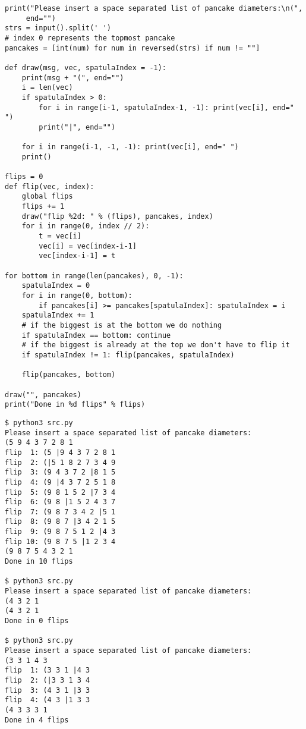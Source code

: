 \documentclass[11pt]{article}
\begin{document}
\begin{verbatim}
print("Please insert a space separated list of pancake diameters:\n(",
     end="")
strs = input().split(' ')
# index 0 represents the topmost pancake
pancakes = [int(num) for num in reversed(strs) if num != ""]

def draw(msg, vec, spatulaIndex = -1):
    print(msg + "(", end="")
    i = len(vec)
    if spatulaIndex > 0: 
        for i in range(i-1, spatulaIndex-1, -1): print(vec[i], end=" ")
        print("|", end="")

    for i in range(i-1, -1, -1): print(vec[i], end=" ")
    print()

flips = 0
def flip(vec, index):
    global flips
    flips += 1
    draw("flip %2d: " % (flips), pancakes, index)
    for i in range(0, index // 2):
        t = vec[i]
        vec[i] = vec[index-i-1]
        vec[index-i-1] = t

for bottom in range(len(pancakes), 0, -1):
    spatulaIndex = 0
    for i in range(0, bottom):
        if pancakes[i] >= pancakes[spatulaIndex]: spatulaIndex = i
    spatulaIndex += 1
    # if the biggest is at the bottom we do nothing
    if spatulaIndex == bottom: continue
    # if the biggest is already at the top we don't have to flip it
    if spatulaIndex != 1: flip(pancakes, spatulaIndex)

    flip(pancakes, bottom)

draw("", pancakes)
print("Done in %d flips" % flips)
\end{verbatim}

\begin{verbatim}
$ python3 src.py
Please insert a space separated list of pancake diameters:
(5 9 4 3 7 2 8 1
flip  1: (5 |9 4 3 7 2 8 1 
flip  2: (|5 1 8 2 7 3 4 9 
flip  3: (9 4 3 7 2 |8 1 5 
flip  4: (9 |4 3 7 2 5 1 8 
flip  5: (9 8 1 5 2 |7 3 4 
flip  6: (9 8 |1 5 2 4 3 7 
flip  7: (9 8 7 3 4 2 |5 1 
flip  8: (9 8 7 |3 4 2 1 5 
flip  9: (9 8 7 5 1 2 |4 3 
flip 10: (9 8 7 5 |1 2 3 4 
(9 8 7 5 4 3 2 1 
Done in 10 flips

$ python3 src.py
Please insert a space separated list of pancake diameters:
(4 3 2 1
(4 3 2 1 
Done in 0 flips

$ python3 src.py
Please insert a space separated list of pancake diameters:
(3 3 1 4 3
flip  1: (3 3 1 |4 3 
flip  2: (|3 3 1 3 4 
flip  3: (4 3 1 |3 3 
flip  4: (4 3 |1 3 3 
(4 3 3 3 1 
Done in 4 flips
\end{verbatim}

\pagebreak
\end{document}
